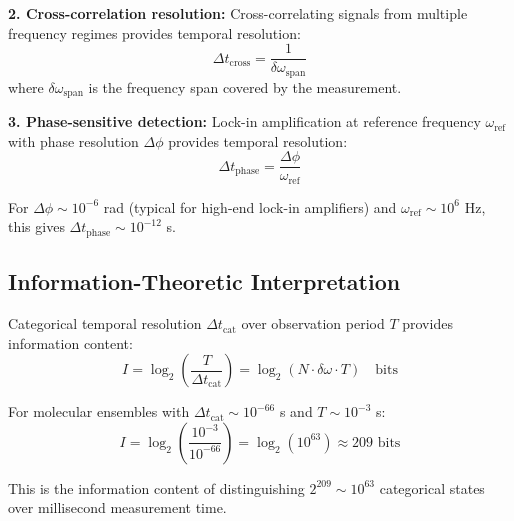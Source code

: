\textbf{2. Cross-correlation resolution:} Cross-correlating signals from multiple frequency regimes provides temporal resolution:
\begin{equation}
\Delta t_{\text{cross}} = \frac{1}{\delta\omega_{\text{span}}}
\end{equation}
where $\delta\omega_{\text{span}}$ is the frequency span covered by the measurement.

\textbf{3. Phase-sensitive detection:} Lock-in amplification at reference frequency $\omega_{\text{ref}}$ with phase resolution $\Delta\phi$ provides temporal resolution:
\begin{equation}
\Delta t_{\text{phase}} = \frac{\Delta\phi}{\omega_{\text{ref}}}
\end{equation}

For $\Delta\phi \sim 10^{-6}$ rad (typical for high-end lock-in amplifiers) and $\omega_{\text{ref}} \sim 10^{6}$ Hz, this gives $\Delta t_{\text{phase}} \sim 10^{-12}$ s.

\subsection{Information-Theoretic Interpretation}

\begin{proposition}
\label{prop:categorical_information}
Categorical temporal resolution $\Delta t_{\text{cat}}$ over observation period $T$ provides information content:
\begin{equation}
I = \log_2\left(\frac{T}{\Delta t_{\text{cat}}}\right) = \log_2(N \cdot \delta\omega \cdot T) \quad \text{bits}
\end{equation}
\end{proposition}

For molecular ensembles with $\Delta t_{\text{cat}} \sim 10^{-66}$ s and $T \sim 10^{-3}$ s:
\begin{equation}
I = \log_2\left(\frac{10^{-3}}{10^{-66}}\right) = \log_2(10^{63}) \approx 209 \text{ bits}
\end{equation}

This is the information content of distinguishing $2^{209} \sim 10^{63}$ categorical states over millisecond measurement time.

